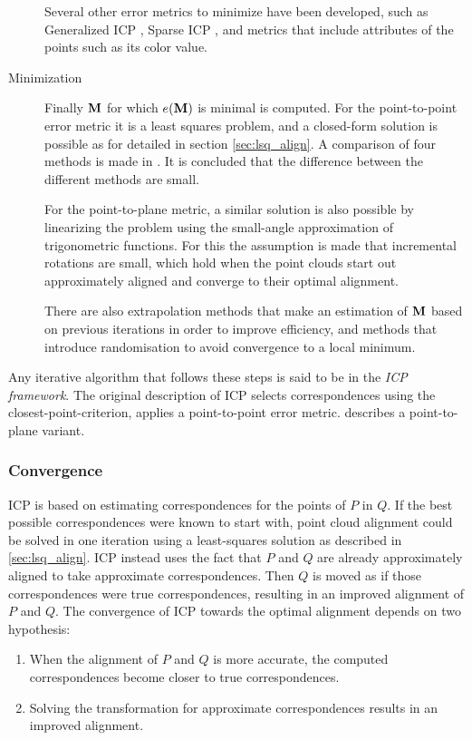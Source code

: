 \begin{description}
Several other error metrics to minimize have been developed, such as Generalized ICP \cite{Sega2009}, Sparse ICP \cite{Boua2013}, and metrics that include attributes of the points such as its color value.

\item[Minimization] Finally $\mathbf{M}$ for which $e(\mathbf{M})$ is minimal is computed. For the point-to-point error metric it is a least squares problem, and a closed-form solution is possible as for detailed in section \ref{sec:lsq_align}. A comparison of four methods is made in \cite{Loru1995}. It is concluded that the difference between the different methods are small.

For the point-to-plane metric, a similar solution is also possible by linearizing the problem using the small-angle approximation of trigonometric functions. \cite{Chen1991} For this the assumption is made that incremental rotations are small, which hold when the point clouds start out approximately aligned and converge to their optimal alignment.

There are also extrapolation methods that make an estimation of $\mathbf{M}$ based on previous iterations in order to improve efficiency, and methods that introduce randomisation to avoid convergence to a local minimum. \cite{Rusi2001}
\end{description}

Any iterative algorithm that follows these steps is said to be in the \emph{ICP framework}. \cite{???} The original description \cite{Besl1992} of ICP selects correspondences using the closest-point-criterion, applies a point-to-point error metric. \cite{Chen1991} describes a point-to-plane variant.


\subsubsection{Convergence}
ICP is based on estimating correspondences for the points of $P$ in $Q$. If the best possible correspondences were known to start with, point cloud alignment could be solved in one iteration using a least-squares solution as described in \ref{sec:lsq_align}. ICP instead uses the fact that $P$ and $Q$ are already approximately aligned to take approximate correspondences. Then $Q$ is moved as if those correspondences were true correspondences, resulting in an improved alignment of $P$ and $Q$.  The convergence of ICP towards the optimal alignment depends on two hypothesis:

\begin{enumerate}
\item When the alignment of $P$ and $Q$ is more accurate, the computed correspondences become closer to true correspondences.
\item Solving the transformation for approximate correspondences results in an improved alignment.
\end{enumerate}


